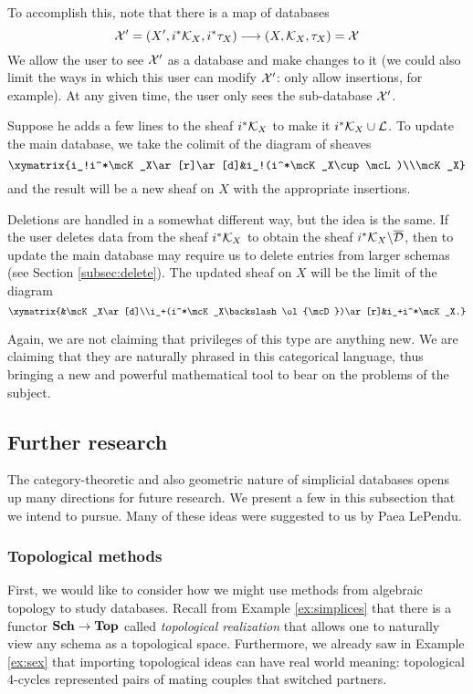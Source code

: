 \documentclass{amsart}
\def\Sch{{\bf Sch}}
\begin{document}
To accomplish this, note that there is a map of databases $$\mathcal{X}'=(X',i^*\mathcal{K}_X,i^*\tau_X)\longrightarrow(X,\mathcal{K}_X,\tau_X)=\mathcal{X}$$  We allow the user to see $\mathcal{X}'$ as a database and make changes to it (we could also limit the ways in which this user can modify $\mathcal{X}'$: only allow insertions, for example).  At any given time, the user only sees the sub-database $\mathcal{X}'$.  

Suppose he adds a few lines to the sheaf $i^*\mathcal{K}_X$ to make it $i^*\mathcal{K}_X\cup\mathcal{L}$.  To update the main database, we take the colimit of the diagram of sheaves $$\xymatrix{i_!i^*\mcK_X\ar[r]\ar[d]&i_!(i^*\mcK_X\cup\mcL)\\\mcK_X}$$ and the result will be a new sheaf on $X$ with the appropriate insertions.  

Deletions are handled in a somewhat different way, but the idea is the same.  If the user deletes data from the sheaf $i^*\mathcal{K}_X$ to obtain the sheaf $i^*\mathcal{K}_X\backslash\overline{\mathcal{D}}$, then to update the main database may require us to delete entries from larger schemas (see Section \ref{subsec:delete}).  The updated sheaf on $X$ will be the limit of the diagram $$\xymatrix{&\mcK_X\ar[d]\\i_+(i^*\mcK_X\backslash\ol{\mcD})\ar[r]&i_+i^*\mcK_X.}$$

Again, we are not claiming that privileges of this type are anything new.  We are claiming that they are naturally phrased in this categorical language, thus bringing a new and powerful mathematical tool to bear on the problems of the subject.

\subsection{Further research}\label{subsec:further research}

The category-theoretic and also geometric nature of simplicial databases opens up many directions for future research.  We present a few in this subsection that we intend to pursue.  Many of these ideas were suggested to us by Paea LePendu.

\subsubsection{Topological methods}\label{subsubsec:top}

First, we would like to consider how we might use methods from algebraic topology to study databases.  Recall from Example \ref{ex:simplices} that there is a functor $\Sch\to\Top$ called {\em topological realization} that allows one to naturally view any schema as a topological space.  Furthermore, we already saw in Example \ref{ex:sex} that importing topological ideas can have real world meaning: topological 4-cycles represented pairs of mating couples that switched partners.  
\end{document}
